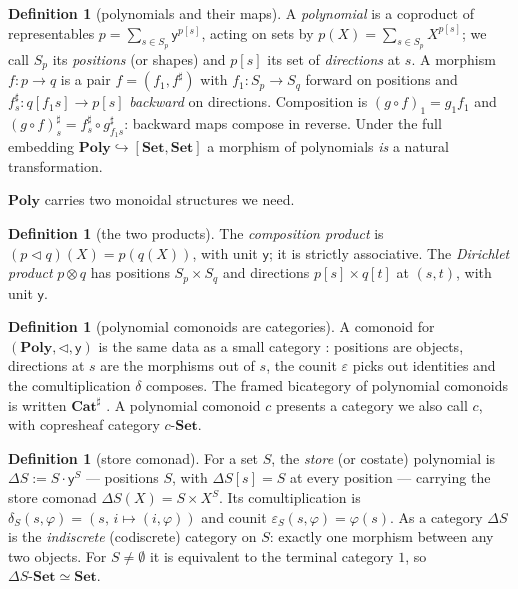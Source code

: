 \documentclass[11pt]{amsart}
\theoremstyle{plain}
\theoremstyle{definition}
\newtheorem{definition}[theorem]{Definition}
\newcommand{\Poly}{\mathbf{Poly}}
\newcommand{\Cathash}{\mathbf{Cat}^{\sharp}}
\newcommand{\Set}{\mathbf{Set}}
\renewcommand{\lhd}{\triangleleft}
\newcommand{\Store}[1]{\Delta #1}
\newcommand{\yon}{\mathsf{y}}
\begin{document}
\begin{definition}[polynomials and their maps]\label{def:poly}
A \emph{polynomial} is a coproduct of representables $p=\sum_{s\in S_p}\yon^{p[s]}$, acting
on sets by $p(X)=\sum_{s\in S_p}X^{p[s]}$; we call $S_p$ its \emph{positions} (or shapes)
and $p[s]$ its set of \emph{directions} at $s$. A morphism $f\colon p\to q$ is a pair
$f=(f_1,f^{\sharp})$ with $f_1\colon S_p\to S_q$ forward on positions and
$f^{\sharp}_s\colon q[f_1 s]\to p[s]$ \emph{backward} on directions. Composition is
$(g\circ f)_1=g_1 f_1$ and $(g\circ f)^{\sharp}_s=f^{\sharp}_s\circ g^{\sharp}_{f_1 s}$:
backward maps compose in reverse. Under the full embedding $\Poly\hookrightarrow[\Set,\Set]$
a morphism of polynomials \emph{is} a natural transformation.
\end{definition}

$\Poly$ carries two monoidal structures we need.

\begin{definition}[the two products]\label{def:products}
The \emph{composition product} is $(p\lhd q)(X)=p(q(X))$, with unit $\yon$; it is strictly
associative. The \emph{Dirichlet product} $p\otimes q$ has positions $S_p\times S_q$ and
directions $p[s]\times q[t]$ at $(s,t)$, with unit $\yon$.
\end{definition}

\begin{definition}[polynomial comonoids are categories]\label{def:comonoid}
A comonoid for $(\Poly,\lhd,\yon)$ is the same data as a small category
\cite{AhmanUustalu,NiuSpivak}: positions are objects, directions at $s$ are the morphisms
out of $s$, the counit $\varepsilon$ picks out identities and the comultiplication $\delta$
composes. The framed bicategory of polynomial comonoids is written $\Cathash$
\cite{NiuSpivak}. A polynomial comonoid $c$ presents a category we also call $c$, with
copresheaf category $c\text{-}\Set$.
\end{definition}

\begin{definition}[store comonad]\label{def:store}
For a set $S$, the \emph{store} (or costate) polynomial is $\Store{S}:=S\cdot\yon^{S}$ ---
positions $S$, with $\Store{S}[s]=S$ at every position --- carrying the store comonad
$\Store{S}(X)=S\times X^{S}$. Its comultiplication is $\delta_S(s,\varphi)=(s,\,i\mapsto
(i,\varphi))$ and counit $\varepsilon_S(s,\varphi)=\varphi(s)$. As a category $\Store{S}$ is
the \emph{indiscrete} (codiscrete) category on $S$: exactly one morphism between any two
objects. For $S\ne\emptyset$ it is equivalent to the terminal category $1$, so
$\Store{S}\text{-}\Set\simeq\Set$.
\end{definition}
\end{document}
